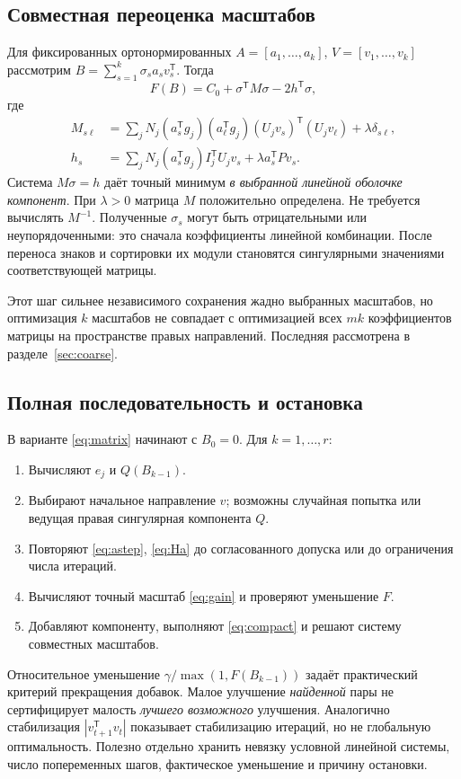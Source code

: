 \documentclass[11pt,a4paper]{article}
\numberwithin{equation}{section}
\theoremstyle{remark}
\newcommand{\T}{^{\mathsf T}}
\begin{document}
\subsection{Совместная переоценка масштабов}\label{sec:scales}
Для фиксированных ортонормированных $A=[a_1,\ldots,a_k]$,
$V=[v_1,\ldots,v_k]$ рассмотрим
$B=\sum_{s=1}^k\sigma_sa_sv_s\T$. Тогда
\begin{equation}\label{eq:scalequadratic}
 F(B)=C_0+\sigma\T M\sigma-2h\T\sigma,
\end{equation}
где
\begin{align}
 M_{s\ell}&=\sum_jN_j(a_s\T g_j)(a_\ell\T g_j)
        (U_jv_s)\T(U_jv_\ell)+\lambda\delta_{s\ell},\label{eq:M}\\
 h_s&=\sum_jN_j(a_s\T g_j)I_j\T U_jv_s+\lambda a_s\T Pv_s.\label{eq:h}
\end{align}
Система $M\sigma=h$ даёт точный минимум \emph{в выбранной линейной оболочке
компонент}. При $\lambda>0$ матрица $M$ положительно определена.
Не требуется вычислять $M^{-1}$. Полученные $\sigma_s$ могут быть
отрицательными или неупорядоченными: это сначала коэффициенты линейной
комбинации. После переноса знаков и сортировки их модули становятся
сингулярными значениями соответствующей матрицы.

Этот шаг сильнее независимого сохранения жадно выбранных масштабов, но
оптимизация $k$ масштабов не совпадает с оптимизацией всех $mk$ коэффициентов
матрицы на пространстве правых направлений. Последняя рассмотрена
в разделе~\ref{sec:coarse}.

\subsection{Полная последовательность и остановка}
В варианте \eqref{eq:matrix} начинают с $B_0=0$. Для $k=1,\ldots,r$:
\begin{enumerate}
 \item Вычисляют $e_j$ и $Q(B_{k-1})$.
 \item Выбирают начальное направление $v$; возможны случайная попытка
 или ведущая правая сингулярная компонента $Q$.
 \item Повторяют \eqref{eq:astep}, \eqref{eq:Ha} до согласованного допуска
 или до ограничения числа итераций.
 \item Вычисляют точный масштаб \eqref{eq:gain} и проверяют уменьшение $F$.
 \item Добавляют компоненту, выполняют \eqref{eq:compact} и решают
 систему совместных масштабов.
\end{enumerate}
Относительное уменьшение $\gamma/\max(1,F(B_{k-1}))$ задаёт практический
критерий прекращения добавок. Малое улучшение \emph{найденной} пары не
сертифицирует малость \emph{лучшего возможного} улучшения.
Аналогично стабилизация $|v_{t+1}\T v_t|$ показывает стабилизацию итераций,
но не глобальную оптимальность. Полезно отдельно хранить невязку условной
линейной системы, число попеременных шагов, фактическое уменьшение и причину
остановки.
\end{document}
